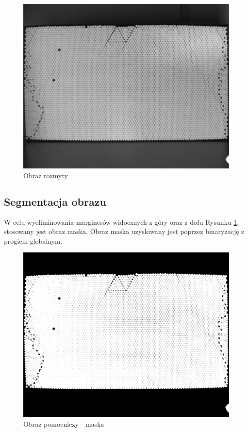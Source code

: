 \documentclass[12pt]{article}
\begin{document}
\begin{figure}[H]
\centering \includegraphics[scale=0.108]{step1.png}
\caption{Obraz rozmyty}
\label{blur}
\end{figure}

\subsection{Segmentacja obrazu}

W celu wyeliminowania marginesów widocznych z góry oraz z dołu Rysunku \ref{blur}, stosowany jest obraz maska. Obraz maska uzyskiwany jest poprzez binaryzację z progiem globalnym.

\begin{figure}[H]
\centering \includegraphics[scale=0.108]{step2.png}
\caption{Obraz pomocniczy - maska}
\label{reduct}
\end{figure}
\end{document}
